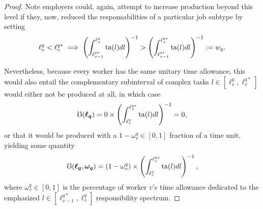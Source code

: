 \documentclass[hidelinks, nonatbib]{elsarticle}
\begin{document}
\begin{lemma}
\begin{proof}
        Note employers could, again, attempt to increase production beyond this level if they, now, reduced the responsabilities of a particular job subtype by setting
        \begin{align}
        \ell_{v}^{q} < \ell_{v}^{q*}
        \implies
            \left(
                \int_{
                    \ell_{v-1}^{q*}
                }^{
                    \ell_{v}^{q}
                }
                \text{ta}(l)dl
            \right) ^ {-1}
            >
            \left(
                \int_{
                    \ell_{v-1}^{q*}
                }^{
                    \ell_{v}^{q*}
                }
                \text{ta}(l)dl
            \right) ^ {-1}
            :=
            w_q
            .
        \end{align}
        
        Nevertheless, because every worker has the same unitary time allowance, this would also entail the complementary subinterval of complex tasks $l \in [\ell_{v}^{q}, \ell_{v}^{q*}]$ would either not be produced at all, in which case
        \begin{align}
            \mho(\boldsymbol{\ell_{q}})
            =
            0
            \times
            \left(
                \int_{
                    \ell_{v}^{q}
                }^{
                    \ell_{v}^{q*}
                }
                \text{ta}(l)dl
            \right) ^ {-1}
            =
            0
            ,
        \end{align}
        or that it would be produced with a $1 - \omega_{v}^{q} \in [0,1]$ fraction of a time unit, yielding some quantity
        \begin{align}
            \mho(
                \boldsymbol{\ell_{q}}
                ,\boldsymbol{\omega_{q}}
            )
            =
            (1 - \omega_{v}^{q})
            \times
            \left(
                \int_{
                    \ell_{v}^{q}
                }^{
                    \ell_{v}^{q*}
                }
                \text{ta}(l)dl
            \right) ^ {-1}
            ,
        \end{align}
        where $\omega_{v}^{q} \in [0,1]$ is the percentage of worker $v$'s time allowance dedicated to the emphasized $l \in [\ell_{v-1}^{q*}, \ell_{v}^{q}]$ responsibility spectrum.
        

\end{proof}
\end{lemma}
\end{document}
